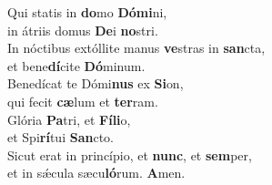 \evenverse Qui statis in \textbf{do}mo \textbf{Dó}\textbf{mi}ni,~\*\\
\evenverse in átriis domus \textbf{De}i \textbf{no}stri.\\
\oddverse In nóctibus extóllite manus \textbf{ve}stras in \textbf{san}cta,~\*\\
\oddverse et bene\textbf{dí}cite \textbf{Dó}minum.\\
\evenverse Benedícat te Dómi\textbf{nus} ex \textbf{Si}on,~\*\\
\evenverse qui fecit \textbf{cæ}lum et \textbf{ter}ram.\\
\oddverse Glória \textbf{Pa}tri, et \textbf{Fí}\textbf{li}o,~\*\\
\oddverse et Spi\textbf{rí}tui \textbf{San}cto.\\
\evenverse Sicut erat in princípio, et \textbf{nunc}, et \textbf{sem}per,~\*\\
\evenverse et in sǽcula sæcu\textbf{ló}rum. \textbf{A}men.\\

